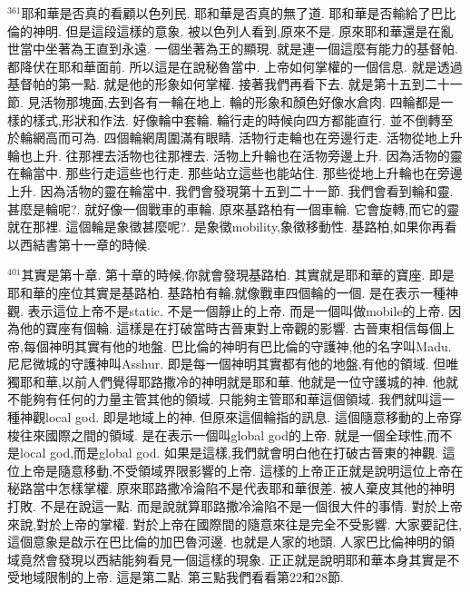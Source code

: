 \documentclass{book}
\begin{document}
$^{361}$耶和華是否真的看顧以色列民.
耶和華是否真的無了道.
耶和華是否輸給了巴比倫的神明.
但是這段這樣的意象.
被以色列人看到,原來不是.
原來耶和華還是在亂世當中坐著為王直到永遠.
一個坐著為王的顯現.
就是連一個這麼有能力的基督帕.
都降伏在耶和華面前.
所以這是在說秘魯當中.
上帝如何掌權的一個信息.
就是透過基督帕的第一點.
就是他的形象如何掌權.
接著我們再看下去.
就是第十五到二十一節.
見活物那塊面,去到各有一輪在地上.
輪的形象和顏色好像水倉肉.
四輪都是一樣的樣式,形狀和作法.
好像輪中套輪.
輪行走的時候向四方都能直行.
並不倒轉至於輪網高而可為.
四個輪網周圍滿有眼睛.
活物行走輪也在旁邊行走.
活物從地上升輪也上升.
往那裡去活物也往那裡去.
活物上升輪也在活物旁邊上升.
因為活物的靈在輪當中.
那些行走這些也行走.
那些站立這些也能站住.
那些從地上升輪也在旁邊上升.
因為活物的靈在輪當中.
我們會發現第十五到二十一節.
我們會看到輪和靈.
甚麼是輪呢?.
就好像一個戰車的車輪.
原來基路柏有一個車輪.
它會旋轉,而它的靈就在那裡.
這個輪是象徵甚麼呢?.
是象徵mobility,象徵移動性.
基路柏,如果你再看以西結書第十一章的時候.

$^{401}$其實是第十章.
第十章的時候,你就會發現基路柏.
其實就是耶和華的寶座.
即是耶和華的座位其實是基路柏.
基路柏有輪,就像戰車四個輪的一個.
是在表示一種神觀.
表示這位上帝不是static.
不是一個靜止的上帝.
而是一個叫做mobile的上帝.
因為他的寶座有個輪.
這樣是在打破當時古晉東對上帝觀的影響.
古晉東相信每個上帝,每個神明其實有他的地盤.
巴比倫的神明有巴比倫的守護神,他的名字叫Madu.
尼尼微城的守護神叫Asshur.
即是每一個神明其實都有他的地盤,有他的領域.
但唯獨耶和華,以前人們覺得耶路撒冷的神明就是耶和華.
他就是一位守護城的神.
他就不能夠有任何的力量主管其他的領域.
只能夠主管耶和華這個領域.
我們就叫這一種神觀local god.
即是地域上的神.
但原來這個輪指的訊息.
這個隨意移動的上帝穿梭往來國際之間的領域.
是在表示一個叫global god的上帝.
就是一個全球性,而不是local god,而是global god.
如果是這樣,我們就會明白他在打破古晉東的神觀.
這位上帝是隨意移動,不受領域界限影響的上帝.
這樣的上帝正正就是說明這位上帝在秘路當中怎樣掌權.
原來耶路撒冷淪陷不是代表耶和華很差.
被人棄皮其他的神明打敗.
不是在說這一點.
而是說就算耶路撒冷淪陷不是一個很大件的事情.
對於上帝來說,對於上帝的掌權.
對於上帝在國際間的隨意來往是完全不受影響.
大家要記住,這個意象是啟示在巴比倫的加巴魯河邊.
也就是人家的地頭.
人家巴比倫神明的領域竟然會發現以西結能夠看見一個這樣的現象.
正正就是說明耶和華本身其實是不受地域限制的上帝.
這是第二點.
第三點我們看看第22和28節.
\end{document}
